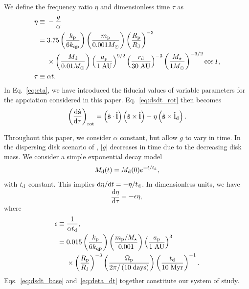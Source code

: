 \documentclass[
        fleqn,
        usenatbib,
    ]{mnras}
\newcommand*{\rd}[2]{\frac{\mathrm{d}#1}{\mathrm{d}#2}}
\newcommand*{\abs}[1]{\left|#1\right|}
\newcommand*{\bm}[1]{\boldsymbol{\mathbf{#1}}}
\newcommand*{\uv}[1]{\hat{\bm{#1}}}
\newcommand*{\p}[1]{\left(#1\right)}
\begin{document}
We define the frequency ratio $\eta$ and dimensionless time $\tau$ as
\begin{align}
    \eta \equiv{}& -\frac{g}{\alpha}\nonumber\\
        ={}& 3.75 \p{\frac{k_{\rm p}}{6k_{\rm qp}}}
            \p{\frac{m_{\rm p}}{0.001 M_\odot}}
            \p{\frac{R_{\rm p}}{R_{\rm J}}}^{-3}\nonumber\\
        &\times \p{\frac{M_{\rm d}}{0.01 M_{\odot}}}
            \p{\frac{a_{\rm p}}{1\;\mathrm{AU}}}^{9/2}
            \p{\frac{r_{\rm d}}{30 \;\mathrm{AU}}}^{-3}
            \p{\frac{M_\star}{1M_{\odot}}}^{-3/2}
            \cos I,\label{eq:eta}\\
    \tau \equiv{}& \alpha t.
\end{align}
In Eq.~\eqref{eq:eta}, we have introduced the fiducial values of variable
parameters for the appciation considered in this paper. Eq.~\eqref{eq:dsdt_rot}
then becomes
\begin{equation}
    \p{\rd{\uv{s}}{\tau}}_{\rm rot} = \p{\uv{s} \cdot \uv{l}}
            \p{\uv{s} \times \uv{l}}
        - \eta\p{\uv{s} \times \uv{l}_{\rm d}}. \label{eq:dsdt_base}
\end{equation}

Throughout this paper, we consider $\alpha$ constant, but allow $g$ to vary in
time. In the dispersing disk scenario of \citet{millholland_disk}, $\abs{g}$
decreases in time due to the decreasing disk mass. We consider a simple
exponential decay model
\begin{equation}
    M_{\rm d}(t) = M_{\rm d}(0)e^{-t/t_{\rm d}},\label{eq:dmd_dt}
\end{equation}
with $t_{\rm d}$ constant. This implies $\mathrm{d}\eta / \mathrm{d}t = -\eta /
t_{\rm d}$. In dimensionless units, we have
\begin{equation}
    \rd{\eta}{\tau} = -\epsilon \eta\label{eq:deta_dt},
\end{equation}
where
\begin{align}
    \epsilon \equiv{}& \frac{1}{\alpha t_{\rm d}},\nonumber\\
        ={}& 0.015 \p{\frac{k_{\rm p}}{6k_{\rm qp}}}
            \p{\frac{m_{\rm p}/M_\star}{0.001}}
            \p{\frac{a_{\rm p}}{1\;\mathrm{AU}}}^3\nonumber\\
        &\times \p{\frac{R_{\rm p}}{R_{\rm J}}}^{-3}
            \p{\frac{\Omega_{\rm p}}{2\pi/\p{10\;\mathrm{days}}}}
            \p{\frac{t_{\rm d}}{10\;\mathrm{Myr}}}^{-1}.\label{eq:eps_def}
\end{align}
Eqs.~\eqref{eq:dsdt_base} and~\eqref{eq:deta_dt} together constitute our system
of study.
\end{document}

